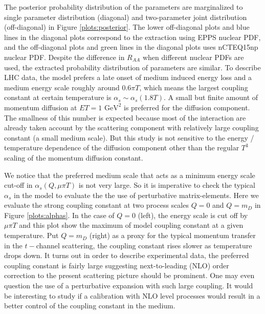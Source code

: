 \documentclass[aps, prc, reprint, amsmath, groupedaddress, nofootinbib]{revtex4-1}
\begin{document}
The posterior probability distribution of the parameters are marginalized to single parameter distribution (diagonal) and two-parameter joint distribution (off-diagonal) in Figure \ref{plots:posterior}.
The lower off-diagonal plots and blue lines in the diagonal plots correspond to the extraction using EPPS nuclear PDF, and the off-diagonal plots and green lines in the diagonal plots uses nCTEQ15np nuclear PDF.
Despite the difference in $R_{AA}$ when different nuclear PDFs are used, the extracted probability distribution of parameters are similar.
To describe LHC data, the model prefers a late onset of medium induced energy loss and a medium energy scale roughly around $0.6\pi T$, which means the largest coupling constant at certain temperature is $\alpha_s \sim \alpha_s(1.8T)$.
A small but finite amount of momentum diffusion at $ET=1\textrm{ GeV}^2$ is preferred for the diffusion component.
The smallness of this number is expected because most of the interaction are already taken account by the scattering component with relatively large coupling constant (a small medium scale).
But this study is not sensitive to the energy / temperature dependence of the diffusion component other than the regular $T^3$ scaling of the momentum diffusion constant.   

We notice that the preferred medium scale that acts as a minimum energy scale cut-off in $\alpha_s(Q, \mu\pi T)$ is not very large.
So it is imperative to check the typical $\alpha_s$ in the model to evaluate the the use of perturbative matrix-elements.
Here we evaluate the strong coupling constant at two process scales $Q=0$ and $Q=m_D$ in Figure \ref{plots:alphas}.
In the case of $Q=0$ (left), the energy scale is cut off by $\mu\pi T$ and this plot show the maximum of model coupling constant at a given temperature.
Put $Q=m_D$ (right) as a proxy for the typical momentum transfer in the $t-$channel scattering, the coupling constant rises slower as temperature drops down.
It turns out in order to describe experimental data, the preferred coupling constant is fairly large suggesting next-to-leading (NLO) order correction to the present scattering picture should be prominent.
One may even question the use of a perturbative expansion with such large coupling.
It would be interesting to study if a calibration with NLO level processes would result in a better control of the coupling constant in the medium.
\end{document}
